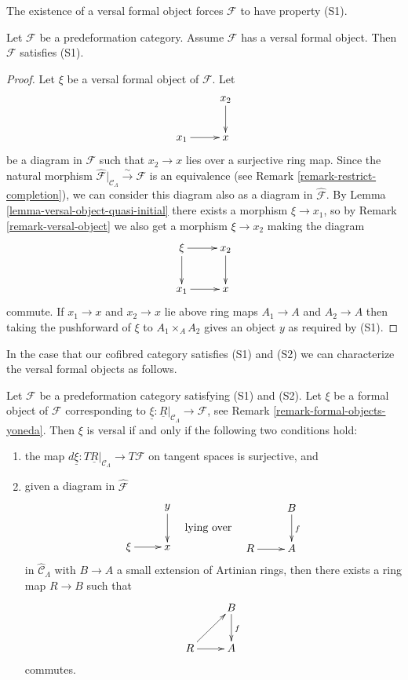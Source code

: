 \noindent
The existence of a versal formal object forces $\mathcal{F}$ to have
property (S1).

\begin{lemma}
\label{lemma-versal-object-S1}
Let $\mathcal{F}$ be a predeformation category.
Assume $\mathcal{F}$ has a versal formal object.
Then $\mathcal{F}$ satisfies (S1).
\end{lemma}

\begin{proof}
Let $\xi$ be a versal formal object of $\mathcal{F}$. Let 
$$
\xymatrix{
           & x_2 \ar[d] \\
x_1 \ar[r] & x   
}
$$
be a diagram in $\mathcal{F}$ such that $x_2 \to x$ lies over a 
surjective ring map. Since the natural morphism
$\widehat{\mathcal{F}}|_{\mathcal{C}_\Lambda} \xrightarrow{\sim} \mathcal{F}$
is an equivalence (see
Remark \ref{remark-restrict-completion}), we can consider this 
diagram also as a diagram in $\widehat{\mathcal{F}}$. By
Lemma \ref{lemma-versal-object-quasi-initial} there exists a morphism
$\xi \to x_1$, so by
Remark \ref{remark-versal-object} we also get a 
morphism $\xi \to x_2$ making the diagram
$$
\xymatrix{
\xi \ar[r] \ar[d]          & x_2 \ar[d] \\
x_1 \ar[r] & x   
}
$$
commute. If $x_1 \to x$ and $x_2 \to x$ lie above ring maps 
$A_1 \to A$ and $A_2 \to A$ then taking the pushforward of 
$\xi$ to $A_1 \times_{A} A_2$ gives an object $y$ as required by (S1).
\end{proof}

\noindent
In the case that our cofibred category satisfies (S1) and (S2)
we can characterize the versal formal objects as follows.

\begin{lemma}
\label{lemma-versal-criterion}
Let $\mathcal{F}$ be a predeformation category satisfying (S1) and 
(S2). Let $\xi$ be a formal object of $\mathcal{F}$ corresponding to
$\underline{\xi} : \underline{R}|_{\mathcal{C}_\Lambda} \to \mathcal{F}$, see
Remark \ref{remark-formal-objects-yoneda}.
Then $\xi$ is versal if and only if the following two conditions hold:
\begin{enumerate}
\item the map
$d\underline{\xi} : T\underline{R}|_{\mathcal{C}_\Lambda} \to T\mathcal{F}$
on tangent spaces is surjective, and
\item given a diagram in $\widehat{\mathcal{F}}$
$$
\vcenter{
\xymatrix{
            &  y \ar[d] \\
\xi \ar[r]  &  x
}
}
\quad\text{lying over}\quad
\vcenter{
\xymatrix{
         &   B  \ar[d]^{f} \\
R \ar[r] &   A 
}
}
$$
in $\widehat{\mathcal{C}}_\Lambda$ with $B \to A$ a small extension of 
Artinian rings, then there exists a ring map $R \to B$ such that
$$
\xymatrix{
         &   B  \ar[d]^{f} \\
R \ar[ur] \ar[r] &   A 
}
$$
commutes.
\end{enumerate}
\end{lemma}

